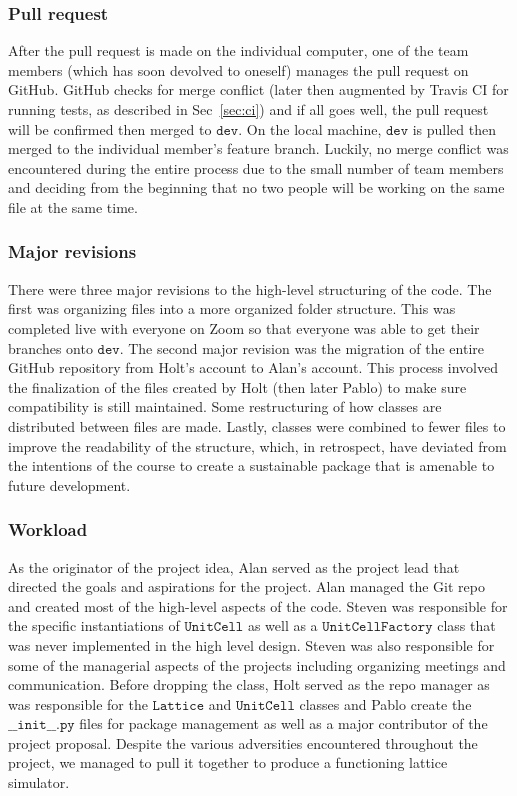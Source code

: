 \documentclass{article}
\begin{document}
\subsubsection{Pull request}
\label{sec:pr}
After the pull request is made on the individual computer, one of the team members (which has soon devolved to oneself) manages the pull request on GitHub.  GitHub checks for merge conflict (later then augmented by Travis CI for running tests, as described in Sec~\ref{sec:ci}) and if all goes well, the pull request will be confirmed then merged to $\texttt{dev}$.  On the local machine, $\texttt{dev}$ is pulled then merged to the individual member's feature branch.  Luckily, no merge conflict was encountered during the entire process due to the small number of team members and deciding from the beginning that no two people will be working on the same file at the same time.

\subsubsection{Major revisions}
There were three major revisions to the high-level structuring of the code.  The first was organizing files into a more organized folder structure.  This was completed live with everyone on Zoom so that everyone was able to get their branches onto $\texttt{dev}$.  The second major revision was the migration of the entire GitHub repository from Holt's account to Alan's account.  This process involved the finalization of the files created by Holt (then later Pablo) to make sure compatibility is still maintained.  Some restructuring of how classes are distributed between files are made.  Lastly, classes were combined to fewer files to improve the readability of the structure, which, in retrospect, have deviated from the intentions of the course to create a sustainable package that is amenable to future development.

\subsubsection{Workload}
As the originator of the project idea, Alan served as the project lead that directed the goals and aspirations for the project.  Alan managed the Git repo and created most of the high-level aspects of the code.  Steven was responsible for the specific instantiations of $\texttt{UnitCell}$ as well as a $\texttt{UnitCellFactory}$ class that was never implemented in the high level design.  Steven was also responsible for some of the managerial aspects of the projects including organizing meetings and communication.  Before dropping the class, Holt served as the repo manager as was responsible for the $\texttt{Lattice}$ and $\texttt{UnitCell}$ classes and Pablo create the $\texttt{\_\_init\_\_.py}$ files for package management as well as a major contributor of the project proposal.  Despite the various adversities encountered throughout the project, we managed to pull it together to produce a functioning lattice simulator.
\end{document}
